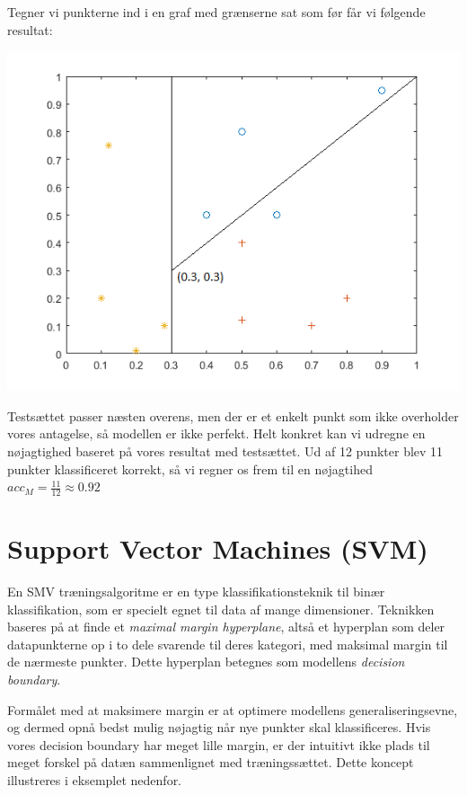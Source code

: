 \documentclass{article}
\begin{document}
Tegner vi punkterne ind i en graf med grænserne sat som før får vi følgende resultat:
\begin{center}
	\includegraphics{decision_tree_example_plot_test}
\end{center}
Testsættet passer næsten overens, men der er et enkelt punkt som ikke overholder vores antagelse, så modellen er ikke perfekt. Helt konkret kan vi udregne en nøjagtighed baseret på vores resultat med testsættet. Ud af 12 punkter blev 11 punkter klassificeret korrekt, så vi regner os frem til en nøjagtihed $acc_M=\frac{11}{12}\approx0.92$


\section{Support Vector Machines (SVM)}

En SMV træningsalgoritme er en type klassifikationsteknik til binær klassifikation, som er specielt egnet til data af mange dimensioner. Teknikken baseres på at finde et \textit{maximal margin hyperplane}, altså et hyperplan som deler datapunkterne op i to dele svarende til deres kategori, med maksimal margin til de nærmeste punkter. Dette hyperplan betegnes som modellens \textit{decision boundary}.

Formålet med at maksimere margin er at optimere modellens generaliseringsevne, og dermed opnå bedst mulig nøjagtig når nye punkter skal klassificeres. Hvis vores decision boundary har meget lille margin, er der intuitivt ikke plads til meget forskel på datæn sammenlignet med træningssættet. Dette koncept illustreres i eksemplet nedenfor.
\end{document}
